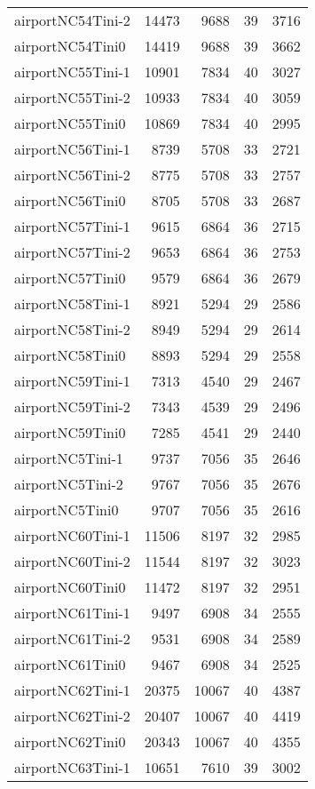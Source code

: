 \begin{longtable}{lrrrr}
airportNC54Tini-2 & 14473 & 9688 & 39 & 3716 \\
airportNC54Tini0 & 14419 & 9688 & 39 & 3662 \\
airportNC55Tini-1 & 10901 & 7834 & 40 & 3027 \\
airportNC55Tini-2 & 10933 & 7834 & 40 & 3059 \\
airportNC55Tini0 & 10869 & 7834 & 40 & 2995 \\
airportNC56Tini-1 & 8739 & 5708 & 33 & 2721 \\
airportNC56Tini-2 & 8775 & 5708 & 33 & 2757 \\
airportNC56Tini0 & 8705 & 5708 & 33 & 2687 \\
airportNC57Tini-1 & 9615 & 6864 & 36 & 2715 \\
airportNC57Tini-2 & 9653 & 6864 & 36 & 2753 \\
airportNC57Tini0 & 9579 & 6864 & 36 & 2679 \\
airportNC58Tini-1 & 8921 & 5294 & 29 & 2586 \\
airportNC58Tini-2 & 8949 & 5294 & 29 & 2614 \\
airportNC58Tini0 & 8893 & 5294 & 29 & 2558 \\
airportNC59Tini-1 & 7313 & 4540 & 29 & 2467 \\
airportNC59Tini-2 & 7343 & 4539 & 29 & 2496 \\
airportNC59Tini0 & 7285 & 4541 & 29 & 2440 \\
airportNC5Tini-1 & 9737 & 7056 & 35 & 2646 \\
airportNC5Tini-2 & 9767 & 7056 & 35 & 2676 \\
airportNC5Tini0 & 9707 & 7056 & 35 & 2616 \\
airportNC60Tini-1 & 11506 & 8197 & 32 & 2985 \\
airportNC60Tini-2 & 11544 & 8197 & 32 & 3023 \\
airportNC60Tini0 & 11472 & 8197 & 32 & 2951 \\
airportNC61Tini-1 & 9497 & 6908 & 34 & 2555 \\
airportNC61Tini-2 & 9531 & 6908 & 34 & 2589 \\
airportNC61Tini0 & 9467 & 6908 & 34 & 2525 \\
airportNC62Tini-1 & 20375 & 10067 & 40 & 4387 \\
airportNC62Tini-2 & 20407 & 10067 & 40 & 4419 \\
airportNC62Tini0 & 20343 & 10067 & 40 & 4355 \\
airportNC63Tini-1 & 10651 & 7610 & 39 & 3002 \\

\end{longtable}
